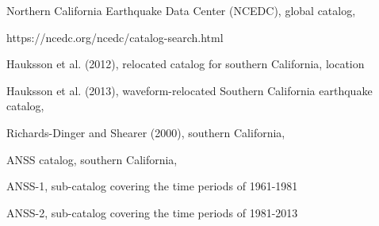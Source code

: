 \documentclass[12pt]{article} %
\theoremstyle{plain}
\begin{document}
	\begin{itemize} 
		{\setlength\itemindent{15pt} \item Northern California Earthquake Data Center (NCEDC), global catalog,} https://ncedc.org/ncedc/catalog-search.html 
		{\setlength\itemindent{15pt} \item Hauksson et al. (2012), relocated catalog for southern California, location }
		{\setlength\itemindent{15pt}\item 	Hauksson et al. (2013), waveform-relocated Southern California earthquake catalog,}
		{\setlength\itemindent{15pt}\item Richards-Dinger and Shearer (2000), southern California,}
		\item ANSS catalog, southern California,  
		{\setlength\itemindent{25pt} \item ANSS-1, sub-catalog covering the time periods of 1961-1981 }
		{\setlength\itemindent{25pt}\item ANSS-2, sub-catalog covering the time periods of 1981-2013}
		
	\end{itemize}
	
\end{document}
